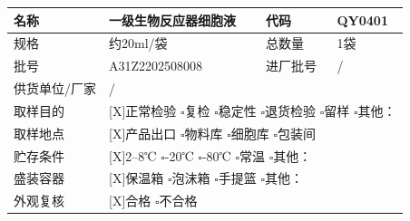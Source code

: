 \documentclass[UTF8,10pt,a4paper,fontset=fandol]{ctexart}
\renewcommand{\arraystretch}{1.15}
\newcommand{\fieldvalue}[1]{#1}
\begin{document}
\renewcommand{\arraystretch}{1.7}
\small
\begin{tabularx}{\textwidth}{|p{2.0cm}|X|p{2.0cm}|X|}
\hline
名称 &
\fieldvalue{一级生物反应器细胞液} &
代码 &
\fieldvalue{QY0401}
\\ \hline

规格 &
\fieldvalue{约20ml/袋} &
总数量 &
\fieldvalue{1袋}
\\ \hline

批号 &
\fieldvalue{A31Z2202508008} &
进厂批号 &
\fieldvalue{/}
\\ \hline

\multicolumn{1}{|c|}{供货单位/厂家} &
\multicolumn{3}{l|}{
\fieldvalue{/}
}
\\ \hline

取样目的 &
\multicolumn{3}{l|}{
\fieldvalue{[X]正常检验}\quad
$\square$复检\quad
$\square$稳定性
\newline
\hspace*{5.1em}$\square$退货检验\quad
$\square$留样\quad
$\square$其他：\underline{\hspace{3em}}
}
\\ \hline

取样地点 &
\multicolumn{3}{l|}{
\fieldvalue{[X]产品出口}\quad
$\square$物料库\quad
$\square$细胞库\quad
$\square$包装间
}
\\ \hline

贮存条件 &
\multicolumn{3}{l|}{
\fieldvalue{[X]2--8℃}\quad
$\square$-20℃\quad
$\square$-80℃\quad
$\square$常温\quad
$\square$其他：\underline{\hspace{3em}}
}
\\ \hline

盛装容器 &
\multicolumn{3}{l|}{
\fieldvalue{[X]保温箱}\quad
$\square$泡沫箱\quad
$\square$手提篮\quad
$\square$其他：\underline{\hspace{3em}}
}
\\ \hline

外观复核 &
\multicolumn{3}{l|}{
\fieldvalue{[X]合格}\quad
$\square$不合格
}
\\ \hline


\end{tabularx}
\end{document}
